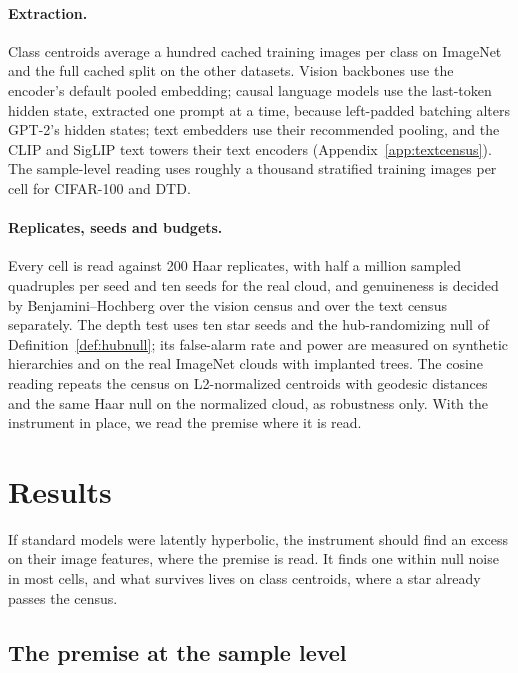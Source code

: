 \documentclass{article}
\theoremstyle{definition}
\begin{document}
\paragraph{Extraction.} Class centroids average a hundred cached training images per class on ImageNet and the full cached split on the other datasets. Vision backbones use the encoder's default pooled embedding; causal language models use the last-token hidden state, extracted one prompt at a time, because left-padded batching alters GPT-2's hidden states; text embedders use their recommended pooling, and the CLIP and SigLIP text towers their text encoders (Appendix~\ref{app:textcensus}). The sample-level reading uses roughly a thousand stratified training images per cell for CIFAR-100 and DTD.

\paragraph{Replicates, seeds and budgets.} Every cell is read against 200 Haar replicates, with half a million sampled quadruples per seed and ten seeds for the real cloud, and genuineness is decided by Benjamini--Hochberg over the vision census and over the text census separately. The depth test uses ten star seeds and the hub-randomizing null of Definition~\ref{def:hubnull}; its false-alarm rate and power are measured on synthetic hierarchies and on the real ImageNet clouds with implanted trees. The cosine reading repeats the census on L2-normalized centroids with geodesic distances and the same Haar null on the normalized cloud, as robustness only. With the instrument in place, we read the premise where it is read.

\section{Results}
\label{sec:form}

If standard models were latently hyperbolic, the instrument should find an excess on their image features, where the premise is read. It finds one within null noise in most cells, and what survives lives on class centroids, where a star already passes the census.

\subsection{The premise at the sample level}
\label{sec:v2-sample}
\end{document}
